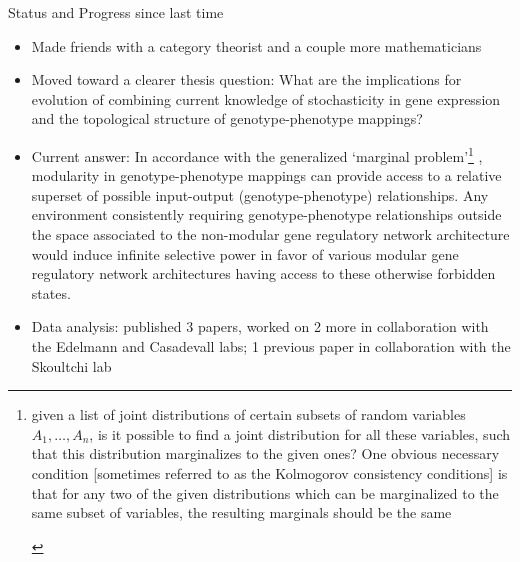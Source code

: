 \begin{frame}
    \begin{block}{Status and Progress since last time}
    \begin{scriptsize}
    \begin{itemize}
    \item Made friends with a category theorist and a couple more mathematicians
    \item Moved toward a clearer thesis question: What are the implications for evolution of combining current knowledge of stochasticity in gene expression and the topological structure of genotype-phenotype mappings?
    \item Current answer: In accordance with the generalized `marginal problem'\footnote{\begin{tiny}
given a list of joint distributions of certain subsets of random variables $A_1, \ldots , A_n$, is it possible to find a joint distribution for all these variables, such that this distribution marginalizes to the given ones? One obvious necessary condition [sometimes referred to as the Kolmogorov consistency conditions] is that for any two of the given distributions which can be marginalized to the same subset of variables, the resulting marginals should be the same \cite{Fritz}
    \end{tiny}} , modularity in genotype-phenotype mappings can provide access to a relative superset of possible input-output (genotype-phenotype) relationships. Any environment consistently requiring genotype-phenotype relationships outside the space associated to the non-modular gene regulatory network architecture would induce infinite selective power in favor of various modular gene regulatory network architectures having access to these otherwise forbidden states.
    \item Data analysis: published 3 papers, worked on 2 more in collaboration with the Edelmann and Casadevall labs; 1 previous paper in collaboration with the Skoultchi lab
    \end{itemize}
    \end{scriptsize}
    \end{block}
    \end{frame}
